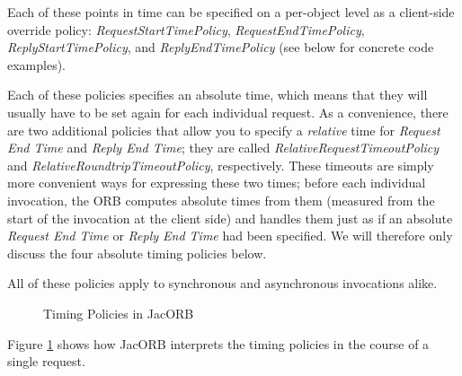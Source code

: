 Each of these points in time can be specified on a per-object level as
a client-side override policy: \mbox{\emph{RequestStartTimePolicy}},
\emph{RequestEndTimePolicy}, \emph{ReplyStartTimePolicy}, and
\emph{ReplyEndTimePolicy} (see below for concrete code examples).

Each of these policies specifies an absolute time, which means that
they will usually have to be set again for each individual
request.  As a convenience, there are two additional policies that
allow you to specify a \emph{relative} time for \emph{Request End
Time} and \emph{Reply End Time}; they are called
\emph{RelativeRequestTimeoutPolicy} and
\emph{RelativeRoundtripTimeoutPolicy}, respectively.  These timeouts
are simply more convenient ways for expressing these two times;
before each individual invocation, the ORB computes absolute times
from them (measured from the start of the invocation at the client
side) and handles them just as if an absolute \emph{Request End Time}
or \emph{Reply End Time} had been specified.  We will therefore only
discuss the four absolute timing policies below.

All of these policies apply to synchronous and asynchronous
invocations alike.

\begin{figure}[htb]
  \begin{center}
  \end{center}
\caption{Timing Policies in JacORB}
\label{fig:timing}
\end{figure}

Figure \ref{fig:timing} shows how JacORB interprets the timing
policies in the course of a single request.

